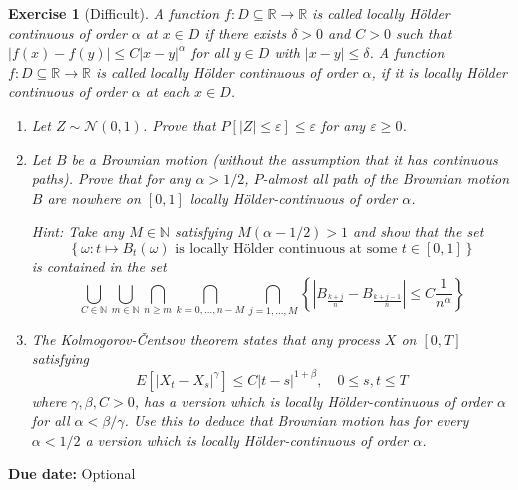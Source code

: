 \documentclass[DIV=classic,a4paper,10pt]{scrartcl}
\newtheorem{exercise}[theorem]{Exercise}
\theoremstyle{nonumberplain}
\numberwithin{equation}{section}
\begin{document}
\begin{exercise}[Difficult]
   A function $f: D \subseteq \mathbb R \to \mathbb R$ is called locally H\"older continuous of order $\alpha$ at $x \in D$ if there exists $\delta > 0$ and $C > 0$ such that $|f (x) - f (y)| \leq C|x - y|^\alpha$ for all $y \in D$ with $|x - y| \leq \delta$.
   A function $f : D \subseteq \mathbb R \to \mathbb R$ is called locally H\"older continuous of order $\alpha$, if it is locally H\"older continuous of order $\alpha$ at each $x \in D$.
   \begin{enumerate}[label=\alph*)]
       \item Let $Z \sim \mathcal N (0, 1)$.
           Prove that $P [|Z| \leq \varepsilon] \leq \varepsilon$ for any $\varepsilon \geq  0$.
       \item Let $B$ be a Brownian motion (without the assumption that it has continuous paths).
           Prove that for any $\alpha > 1/2$, $P$-almost all path of the Brownian motion $B$ are nowhere on $[0, 1]$ locally H\"older-continuous of order $\alpha$.
           
           \emph{Hint:} Take any $M \in \mathbb{N}$ satisfying $M (\alpha- 1/2) > 1$ and show that the set
           \begin{equation*}
               \left\{ \omega\colon t\mapsto B_t(\omega)\text{ is locally H\"older continuous at some }t\in [0,1] \right\}
           \end{equation*}
           is contained in the set
           \begin{equation*}
               \bigcup_{C \in \mathbb{N}}\bigcup_{m\in \mathbb{N}}\bigcap_{n\geq m}\bigcap_{k=0,\ldots, n-M}\bigcap_{j=1,\ldots,M}\left\{ \left| B_{\frac{k+j}{n}}-B_{\frac{k+j-1}{n}} \right| \leq C\frac{1}{n^\alpha}\right\}
           \end{equation*}
       \item The Kolmogorov-\v{C}entsov theorem states that any process $X$ on $[0, T]$ satisfying 
           \begin{equation*}
              E\left[ \left| X_t-X_s \right|^{\gamma} \right] \leq C\left| t-s \right|^{1+\beta},\quad 0\leq s,t\leq T
           \end{equation*}
           where $\gamma, \beta, C > 0$, has a version which is locally H\"older-continuous of order $\alpha$ for all $\alpha < \beta/\gamma$.
           Use this to deduce that Brownian motion has for every $\alpha < 1/2$ a version which is locally H\"older-continuous of order $\alpha$. 
   \end{enumerate}
\end{exercise}
\smallskip
\noindent
\textbf{Due date:} Optional
\end{document}
